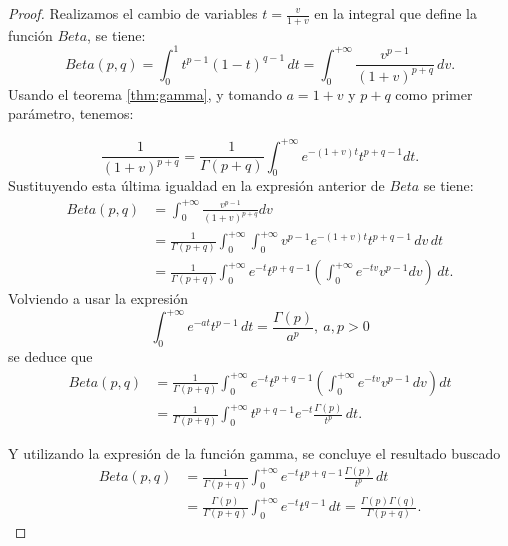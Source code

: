 \begin{proof}
    Realizamos el cambio de variables $t = \frac{v}{1+v}$ en la integral
    que define la función $Beta$, se tiene:
    \[
        Beta(p,q)=\int_{0}^{1}t^{p-1}(1-t)^{q-1}\,dt=
        \int_{0}^{+\infty}\frac{v^{p-1}}{(1+v)^{p+q}}\,dv.
    \]
    Usando el teorema \ref{thm:gamma}, y tomando $a = 1 + v$ y 
    $p + q$ como primer parámetro, tenemos:

    \[
        \frac{1}{(1+v)^{p+q}}=\frac{1}{\Gamma(p+q)} \int_0^{+\infty} e^{-(1+v) t} t^{p+q-1} d t .
    \]
    Sustituyendo esta última igualdad en la expresión anterior
    de $Beta$ se tiene:
    \begin{align*}
        Beta(p, q) &=\int_0^{+\infty} \frac{v^{p-1}}{(1+v)^{p+q}}
        dv\\
        &=\frac{1}{\Gamma(p+q)} \int_0^{+\infty} \int_0^{+\infty}
        v^{p-1} e^{-(1+v) t} t^{p+q-1} \,dv\,dt\\
        & =\frac{1}{\Gamma(p+q)} \int_0^{+\infty} e^{-t} t^{p+q-1}
        \left(\int_0^{+\infty} e^{-t v} v^{p-1} dv\right)\,dt.
    \end{align*}
    Volviendo a usar la expresión
    \[
        \int_0^{+\infty} e^{-a t} t^{p-1} \,dt=
        \frac{\Gamma(p)}{a^p},\ a, p>0
    \]
    se deduce que
    \begin{align*}
        Beta(p, q)&=\frac{1}{\Gamma(p+q)} \int_0^{+\infty}
        e^{-t} t^{p+q-1} \left(\int_0^{+\infty} e^{-t v} v^{p-1}
        \,dv\right) d t\\
        &=\frac{1}{\Gamma(p+q)}\int_0^{+\infty} t^{p+q-1}
        e^{-t} \frac{\Gamma(p)}{t^p}\,dt.
    \end{align*}
        
    Y utilizando la expresión de la función gamma, se concluye
    el resultado buscado
    \begin{align*}
        Beta(p, q)&=\frac{1}{\Gamma(p+q)} \int_0^{+\infty} e^{-t}
        t^{p+q-1} \frac{\Gamma(p)}{t^p}\,dt\\
        &=\frac{\Gamma(p)}{\Gamma(p+q)} \int_0^{+\infty} e^{-t}
        t^{q-1} \,dt=\frac{\Gamma(p) \Gamma(q)} {\Gamma(p+q)}.
    \end{align*}
    
\end{proof}
